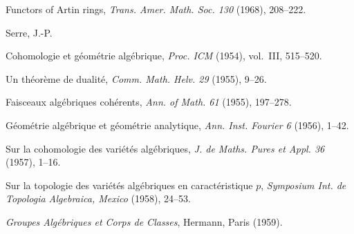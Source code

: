 {\noindent\hangindent=25bp\hspace*{6bp}%
Functors of Artin rings, \emph{Trans. Amer. Math. Soc. 130} (1968), 208--222.\par
\par\vspace{2.15pt}\noindent Serre, J.-P.\par
\noindent\hangindent=25bp\hspace*{6bp}%
Cohomologie et g\'eom\'etrie alg\'ebrique, \emph{Proc. ICM} (1954), vol.~III, 515--520.\par
\noindent\hangindent=25bp\hspace*{6bp}%
Un th\'eor\`eme de dualit\'e, \emph{Comm. Math. Helv. 29} (1955), 9--26.\par
\noindent\hangindent=25bp\hspace*{6bp}%
Faisceaux alg\'ebriques coh\'erents, \emph{Ann. of Math. 61} (1955), 197--278.\par
\noindent\hangindent=25bp\hspace*{6bp}%
G\'eom\'etrie alg\'ebrique et g\'eom\'etrie analytique, \emph{Ann. Inst. Fourier 6} (1956), 1--42.\par
\noindent\hangindent=25bp\hspace*{6bp}%
Sur la cohomologie des vari\'et\'es alg\'ebriques, \emph{J. de Maths. Pures et Appl. 36} (1957), 1--16.\par
\noindent\hangindent=25bp\hspace*{6bp}%
Sur la topologie des vari\'et\'es alg\'ebriques en caract\'eristique $p$, \emph{Symposium Int. de Topologia Algebraica, Mexico} (1958), 24--53.\par
\noindent\hangindent=25bp\hspace*{6bp}%
\emph{Groupes Alg\'ebriques et Corps de Classes}, Hermann, Paris (1959).\par
\noindent\hangindent=25bp\hspace*{6bp}%
}

